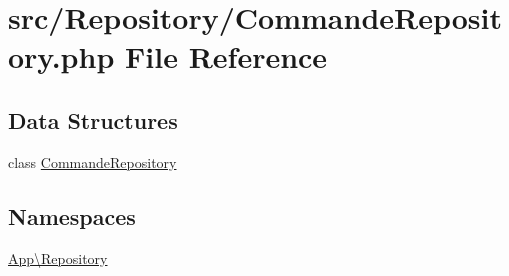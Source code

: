 \hypertarget{_commande_repository_8php}{}\section{src/\+Repository/\+Commande\+Repository.php File Reference}
\label{_commande_repository_8php}
\subsection*{Data Structures}
\begin{DoxyCompactItemize}
\item 
class \mbox{\hyperlink{class_app_1_1_repository_1_1_commande_repository}{Commande\+Repository}}
\end{DoxyCompactItemize}
\subsection*{Namespaces}
\begin{DoxyCompactItemize}
\item 
 \mbox{\hyperlink{namespace_app_1_1_repository}{App\textbackslash{}\+Repository}}
\end{DoxyCompactItemize}
